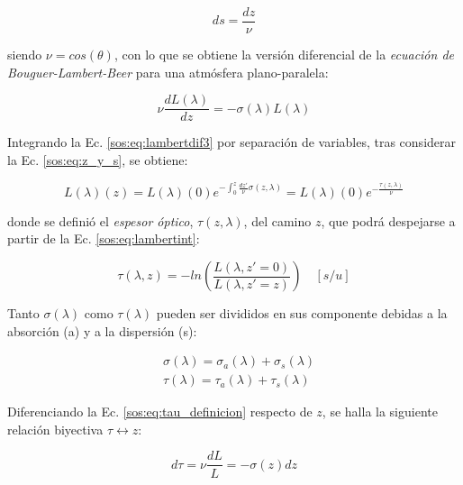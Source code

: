         \begin{equation}
        ds=\frac{dz}{\nu}
        \label{sos:eq:z_y_s}
        \end{equation}
        
        \noindent siendo $\nu=cos(\theta)$, con lo que se obtiene la versión diferencial de la \textit{ecuación de Bouguer-Lambert-Beer} para una atmósfera plano-paralela:
        
        \begin{equation}
        \nu \frac{d L(\lambda)}{dz}=-\sigma(\lambda) L(\lambda)
        \label{sos:eq:lambertdif3}
        \end{equation}
        
        Integrando la Ec. \ref{sos:eq:lambertdif3} por separación de variables, tras considerar la Ec. \ref{sos:eq:z_y_s}, se obtiene:
        
        \begin{equation}
        L(\lambda)(z)=L(\lambda)(0)e^{-\int_{0}^{z}\frac{dz'}{\nu} \sigma(z,\lambda)}=L(\lambda)(0)e^{-\frac{\tau(z,\lambda)}{\nu}}
        \label{sos:eq:lambertint}
        \end{equation}
        
        \noindent donde se definió el \textit{espesor óptico}, $\tau(z,\lambda)$, del camino $z$, que podrá despejarse a partir de la Ec. \ref{sos:eq:lambertint}:
        
        \begin{equation}
        \tau(\lambda,z)=-ln \left( \frac{L(\lambda,z'=0)}{L(\lambda,z'=z)} \right) \quad [s/u]
        \label{sos:eq:tau_definicion}
        \end{equation}
        
        Tanto $\sigma(\lambda)$ como $\tau(\lambda)$ pueden ser divididos en sus componente debidas a la absorción (a) y a la dispersión (s):
        
        \begin{align}
         &\sigma(\lambda)=\sigma_{a}(\lambda)+\sigma_{s}(\lambda)\\
         &\tau(\lambda)=\tau_{a}(\lambda)+\tau_{s}(\lambda)
        \label{sos:eq:abs_sca}
         \end{align}
        
        Diferenciando la Ec. \ref{sos:eq:tau_definicion} respecto de $z$, se halla la siguiente relación biyectiva $\tau\leftrightarrow z$:
        
        \begin{equation}
        d\tau=\nu \frac{dL}{L}=-\sigma(z) dz
        \label{sos:eq:tau_y_z}
        \end{equation}
        
